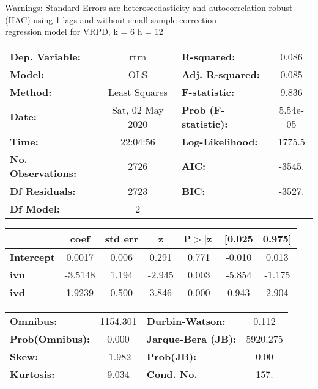 Warnings: \newline
 [1] Standard Errors are heteroscedasticity and autocorrelation robust (HAC) using 1 lags and without small sample correction\\ 

regression model for VRPD, k = 6 h = 12\begin{center}
\begin{tabular}{lclc}
\toprule
\textbf{Dep. Variable:}    &       rtrn       & \textbf{  R-squared:         } &     0.086   \\
\textbf{Model:}            &       OLS        & \textbf{  Adj. R-squared:    } &     0.085   \\
\textbf{Method:}           &  Least Squares   & \textbf{  F-statistic:       } &     9.836   \\
\textbf{Date:}             & Sat, 02 May 2020 & \textbf{  Prob (F-statistic):} &  5.54e-05   \\
\textbf{Time:}             &     22:04:56     & \textbf{  Log-Likelihood:    } &    1775.5   \\
\textbf{No. Observations:} &        2726      & \textbf{  AIC:               } &    -3545.   \\
\textbf{Df Residuals:}     &        2723      & \textbf{  BIC:               } &    -3527.   \\
\textbf{Df Model:}         &           2      & \textbf{                     } &             \\
\bottomrule
\end{tabular}
\begin{tabular}{lcccccc}
                   & \textbf{coef} & \textbf{std err} & \textbf{z} & \textbf{P$> |$z$|$} & \textbf{[0.025} & \textbf{0.975]}  \\
\midrule
\textbf{Intercept} &       0.0017  &        0.006     &     0.291  &         0.771        &       -0.010    &        0.013     \\
\textbf{ivu}       &      -3.5148  &        1.194     &    -2.945  &         0.003        &       -5.854    &       -1.175     \\
\textbf{ivd}       &       1.9239  &        0.500     &     3.846  &         0.000        &        0.943    &        2.904     \\
\bottomrule
\end{tabular}
\begin{tabular}{lclc}
\textbf{Omnibus:}       & 1154.301 & \textbf{  Durbin-Watson:     } &    0.112  \\
\textbf{Prob(Omnibus):} &   0.000  & \textbf{  Jarque-Bera (JB):  } & 5920.275  \\
\textbf{Skew:}          &  -1.982  & \textbf{  Prob(JB):          } &     0.00  \\
\textbf{Kurtosis:}      &   9.034  & \textbf{  Cond. No.          } &     157.  \\
\bottomrule
\end{tabular}
\end{center}

